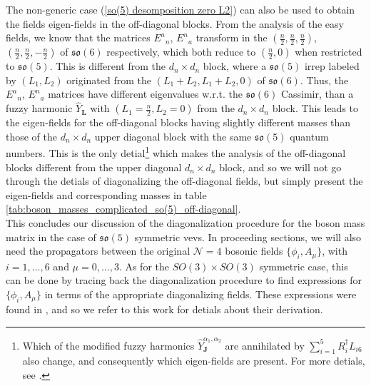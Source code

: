 The non-generic case (\ref{so(5) desomposition zero L2}) can also be used to obtain the fields eigen-fields in the off-diagonal blocks. From the analysis of the easy fields, we know that the matrices ${E^a}_n$, ${E^n}_a$ transform in the $(\tfrac{n}{2},\tfrac{n}{2},\tfrac{n}{2})$, $(\tfrac{n}{2},\tfrac{n}{2},-\tfrac{n}{2})$ of $\mathfrak{so}(6)$ respectively, which both reduce to $(\tfrac{n}{2},0)$ when restricted to $\mathfrak{so}(5)$. This is different from the $d_n \times d_n$ block, where a $\mathfrak{so}(5)$ irrep  labeled by $(L_1,L_2)$ originated from the $(L_1 + L_2, L_1 + L_2,0)$ of $\mathfrak{so}(6)$. Thus, the ${E^a}_n$, ${E^n}_a$ matrices have different eigenvalues w.r.t. the $\mathfrak{so}(6)$ Cassimir, than a fuzzy harmonic $\hat{Y}_{\mathbf{L}}$ with $(L_1=\tfrac{n}{2}, L_2 = 0)$ from the $d_n \times d_n$ block. This leads to the eigen-fields for the off-diagonal blocks having slightly different masses than those of the $d_n \times d_n$ upper diagonal block with the same $\mathfrak{so}(5)$ quantum numbers. This is the only detial\footnote{Which of the modified fuzzy harmonics $\hat{Y}^{\alpha_1,\alpha_2}_{\mathbf{J}}$ are annihilated by $\sum_{i=1}^5 R^\dagger_i L_{i6}$ also change, and consequently which eigen-fields are present. For more detials, see \cite{One-point functions in D3-D7 SO(5)}.} which makes the analysis of the off-diagonal blocks different from the upper diagonal $d_n \times d_n$ block, and so we will not go through the detials of diagonalizing the off-diagonal fields, but simply present the eigen-fields and corresponding masses in table \ref{tab:boson_masses_complicated_so(5)_off-diagonal}.\\
This concludes our discussion of the diagonalization procedure for the boson mass matrix in the case of $\mathfrak{so}(5)$ symmetric vevs. In proceeding sections, we will also need the propagators between the original $\mathcal{N} = 4$ bosonic fields $\{\phi_i , A_\mu \}$, with $i=1,\ldots,6$ and $\mu = 0,\ldots, 3$. As for the $SO(3) \times SO(3)$ symmetric case, this can be done by tracing back the diagonalization procedure to find expressions for $\{\phi_i , A_\mu \}$ in terms of the appropriate diagonalizing fields. These expressions were found in \cite{One-point functions in D3-D7 SO(5)}, and so we refer to this work for detials about their derivation.
%
%
